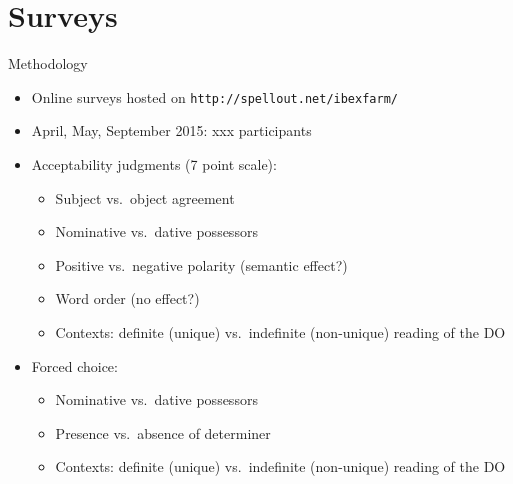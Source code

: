 \documentclass[12pt]{beamer}
\begin{document}
\section{Surveys}

\begin{frame}{Methodology}

    \begin{itemize}

        \item Online surveys hosted on \texttt{http://spellout.net/ibexfarm/}

        \item April, May, September 2015: xxx participants

        \item Acceptability judgments (7 point scale):

            \begin{itemize}

                \item Subject vs.~object agreement

                \item Nominative vs.~dative possessors

                \item Positive vs.~negative polarity (semantic effect?)

                \item Word order (no effect?)

                \item Contexts: definite (unique) vs.~indefinite (non-unique) reading of the DO

            \end{itemize}

        \item Forced choice:

            \begin{itemize}

                \item Nominative vs.~dative possessors

                \item Presence vs.~absence of determiner

                \item Contexts: definite (unique) vs.~indefinite (non-unique) reading of the DO

            \end{itemize}

    \end{itemize}

\end{frame}
\end{document}
